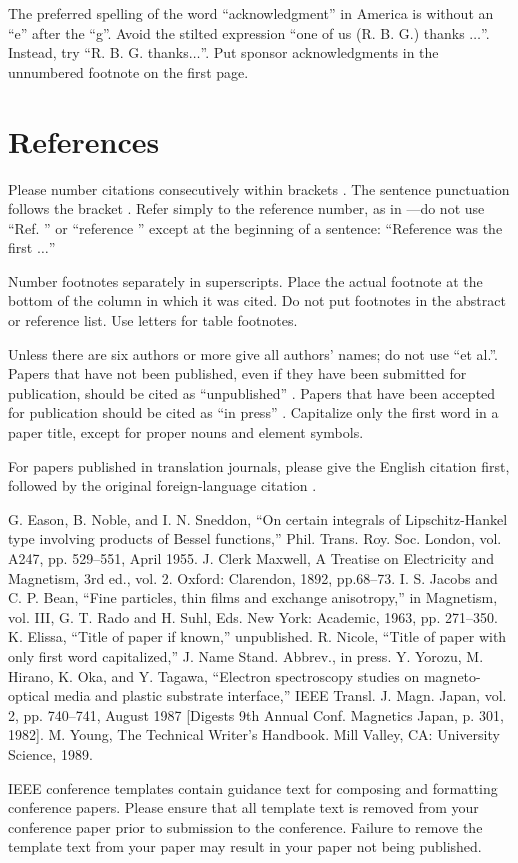 \documentclass[conference]{IEEEtran}
\begin{document}
The preferred spelling of the word ``acknowledgment'' in America is without 
an ``e'' after the ``g''. Avoid the stilted expression ``one of us (R. B. 
G.) thanks $\ldots$''. Instead, try ``R. B. G. thanks$\ldots$''. Put sponsor 
acknowledgments in the unnumbered footnote on the first page.

\section*{References}

Please number citations consecutively within brackets \cite{b1}. The 
sentence punctuation follows the bracket \cite{b2}. Refer simply to the reference 
number, as in \cite{b3}---do not use ``Ref. \cite{b3}'' or ``reference \cite{b3}'' except at 
the beginning of a sentence: ``Reference \cite{b3} was the first $\ldots$''

Number footnotes separately in superscripts. Place the actual footnote at 
the bottom of the column in which it was cited. Do not put footnotes in the 
abstract or reference list. Use letters for table footnotes.

Unless there are six authors or more give all authors' names; do not use 
``et al.''. Papers that have not been published, even if they have been 
submitted for publication, should be cited as ``unpublished'' \cite{b4}. Papers 
that have been accepted for publication should be cited as ``in press'' \cite{b5}. 
Capitalize only the first word in a paper title, except for proper nouns and 
element symbols.

For papers published in translation journals, please give the English 
citation first, followed by the original foreign-language citation \cite{b6}.

\begin{thebibliography}{00}
 G. Eason, B. Noble, and I. N. Sneddon, ``On certain integrals of Lipschitz-Hankel type involving products of Bessel functions,'' Phil. Trans. Roy. Soc. London, vol. A247, pp. 529--551, April 1955.
 J. Clerk Maxwell, A Treatise on Electricity and Magnetism, 3rd ed., vol. 2. Oxford: Clarendon, 1892, pp.68--73.
 I. S. Jacobs and C. P. Bean, ``Fine particles, thin films and exchange anisotropy,'' in Magnetism, vol. III, G. T. Rado and H. Suhl, Eds. New York: Academic, 1963, pp. 271--350.
 K. Elissa, ``Title of paper if known,'' unpublished.
 R. Nicole, ``Title of paper with only first word capitalized,'' J. Name Stand. Abbrev., in press.
 Y. Yorozu, M. Hirano, K. Oka, and Y. Tagawa, ``Electron spectroscopy studies on magneto-optical media and plastic substrate interface,'' IEEE Transl. J. Magn. Japan, vol. 2, pp. 740--741, August 1987 [Digests 9th Annual Conf. Magnetics Japan, p. 301, 1982].
 M. Young, The Technical Writer's Handbook. Mill Valley, CA: University Science, 1989.
\end{thebibliography}
\vspace{12pt}
\color{red}
IEEE conference templates contain guidance text for composing and formatting conference papers. Please ensure that all template text is removed from your conference paper prior to submission to the conference. Failure to remove the template text from your paper may result in your paper not being published.
\end{document}
